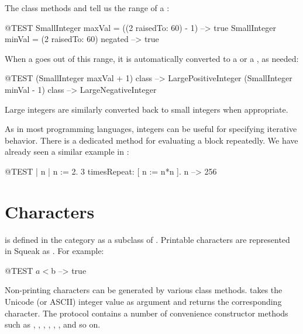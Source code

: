 \documentclass[a4paper,10pt,twoside]{book}
\begin{document}
The class methods  and  tell us the range of a :

\begin{code}{@TEST}
SmallInteger maxVal = ((2 raisedTo: 60) - 1)      --> true
SmallInteger minVal = (2 raisedTo: 60) negated --> true
\end{code}

When a  goes out of this range, it is automatically converted to a  or a , as needed:

\begin{code}{@TEST}
(SmallInteger maxVal + 1) class --> LargePositiveInteger
(SmallInteger minVal - 1) class  --> LargeNegativeInteger
\end{code}

Large integers are similarly converted back to small integers when appropriate.

As in most programming languages, integers can be useful for specifying iterative behavior.
There is a dedicated method  for evaluating a block repeatedly.
We have already seen a similar example in :
\begin{code}{@TEST | n |}
n := 2.
3 timesRepeat: [ n := n*n ].
n --> 256
\end{code}

\section{Characters}

 is defined in the  category as a subclass of .
Printable characters are represented in Squeak as .
For example:

\begin{code}{@TEST}
$a < $b --> true
\end{code}

Non-printing characters can be generated by various class methods.
\mbox{} takes the Unicode (or ASCII) integer value as argument and returns the corresponding character.
The protocol  contains a number of convenience constructor methods such as , , , , , , and so on.
\end{document}
